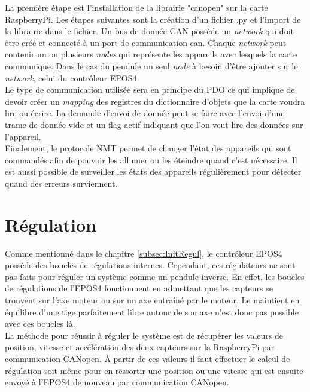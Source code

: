 La première étape est l'installation de la librairie "canopen" sur la carte RaspberryPi. Les étapes suivantes sont la création d'un fichier .py et
l'import de la librairie dans le fichier. Un bus de donnée CAN possède un \textit{network} qui doit être créé et connecté à un port de communication
can. Chaque \textit{network} peut contenir un ou plusieurs \textit{nodes} qui représente les appareils avec lesquels la carte communique. Dans le cas
du pendule un seul \textit{node} à besoin d'être ajouter sur le \textit{network}, celui du contrôleur EPOS4.\\

Le type de communication utilisée sera en principe du \acrshort{PDO} ce qui implique de devoir créer un \textit{mapping} des registres du
dictionnaire d'objets que la carte voudra lire ou écrire. La demande d'envoi de donnée peut se faire avec l'envoi d'une trame de donnée vide
et un flag actif indiquant que l'on veut lire des données sur l'appareil.\\

Finalement, le protocole \acrshort{NMT} permet de changer l'état des appareils qui sont commandés afin de pouvoir les allumer ou les éteindre
quand c'est nécessaire. Il est aussi possible de surveiller les états des appareils régulièrement pour détecter quand des erreurs surviennent.

\section{Régulation}
Comme mentionné dans le chapitre \ref{subsec:InitRegul}, le contrôleur EPOS4 possède des boucles de régulations internes. Cependant, ces régulateurs
ne sont pas faits pour réguler un système comme un pendule inverse. En effet, les boucles de régulations de l'EPOS4 fonctionnent en admettant que
les capteurs se trouvent sur l'axe moteur ou sur un axe entraîné par le moteur. Le maintient en équilibre d'une tige parfaitement libre autour de son
axe n'est donc pas possible avec ces boucles là.\\

La méthode pour réussir à réguler le système est de récupérer les valeurs de position, vitesse et accélération des deux capteurs sur la RaspberryPi
par communication CANopen. À partir de ces valeurs il faut effectuer le calcul de régulation soit même pour en ressortir une position ou une vitesse
qui est ensuite envoyé à l'EPOS4 de nouveau par communication CANopen.\\

